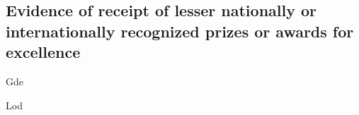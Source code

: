 \subsection{%
    Evidence of receipt of lesser nationally or internationally recognized
    prizes or awards for excellence%
}
\label{subsec:Awards}

{Gde}

\pagebreak

{Lod}

\pagebreak

